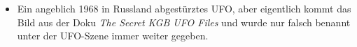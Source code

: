 \documentclass{scrartcl}
\begin{document}
\begin{itemize}
	\item Ein angeblich 1968 in Russland abgestürztes UFO, aber eigentlich kommt das Bild aus der Doku \textit{The Secret KGB UFO Files} und wurde nur falsch benannt unter der UFO-Szene immer weiter gegeben.

\end{itemize}
\end{document}
